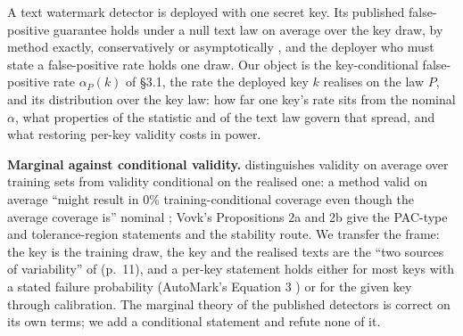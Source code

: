 \documentclass[11pt,letterpaper]{article}
\begin{document}
A text watermark detector is deployed with one secret key. Its published false-positive guarantee holds under a null text law on average over the key draw, by method exactly, conservatively or asymptotically \citep{kirchenbauer2023watermark, kuditipudi2024distortion, li2025framework}, and the deployer who must state a false-positive rate holds one draw. Our object is the key-conditional false-positive rate \(\alpha_P(k)\) of \S{}3.1, the rate the deployed key \(k\) realises on the law \(P\), and its distribution over the key law: how far one key's rate sits from the nominal \(\alpha\), what properties of the statistic and of the text law govern that spread, and what restoring per-key validity costs in power.

\textbf{Marginal against conditional validity.} \citet{vovk2012conditional} distinguishes validity on average over training sets from validity conditional on the realised one: a method valid on average ``might result in 0\% training-conditional coverage even though the average coverage is'' nominal \citep[p.~2]{bian2023training}; Vovk's Propositions 2a and 2b give the PAC-type and tolerance-region statements and \citet{liang2025algorithmic} the stability route. We transfer the frame: the key is the training draw, the key and the realised texts are the ``two sources of variability'' of \citet{ren2022derandomized} (p.~11), and a per-key statement holds either for most keys with a stated failure probability (AutoMark's Equation 3 \citep{gloaguen2026automark}) or for the given key through calibration. The marginal theory of the published detectors is correct on its own terms; we add a conditional statement and refute none of it.
\end{document}
